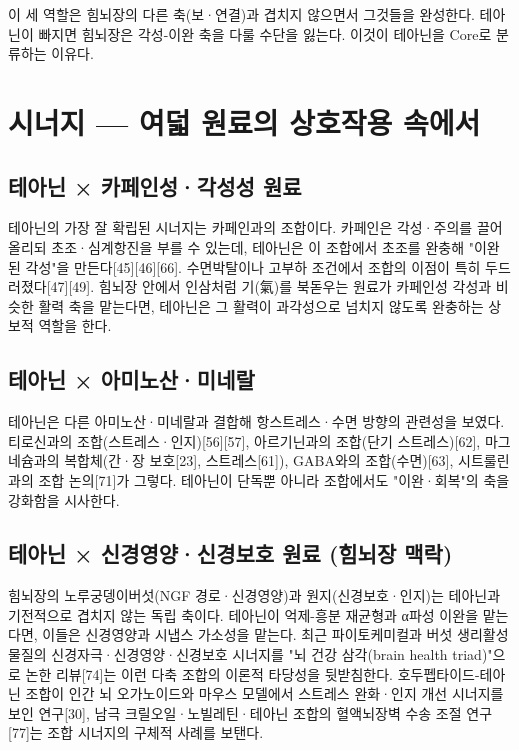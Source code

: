 \documentclass[12pt,oneside]{book}
\begin{document}
이 세 역할은 힘뇌장의 다른 축(보·연결)과 겹치지 않으면서 그것들을 완성한다. 테아닌이 빠지면 힘뇌장은 각성-이완 축을 다룰 수단을 잃는다. 이것이 테아닌을 Core로 분류하는 이유다.

\section{시너지 — 여덟 원료의 상호작용 속에서}

\subsection{테아닌 × 카페인성·각성성 원료}

테아닌의 가장 잘 확립된 시너지는 카페인과의 조합이다. 카페인은 각성·주의를 끌어올리되 초조·심계항진을 부를 수 있는데, 테아닌은 이 조합에서 초조를 완충해 "이완된 각성"을 만든다[45][46][66]. 수면박탈이나 고부하 조건에서 조합의 이점이 특히 두드러졌다[47][49]. 힘뇌장 안에서 인삼처럼 기(氣)를 북돋우는 원료가 카페인성 각성과 비슷한 활력 축을 맡는다면, 테아닌은 그 활력이 과각성으로 넘치지 않도록 완충하는 상보적 역할을 한다.

\subsection{테아닌 × 아미노산·미네랄}

테아닌은 다른 아미노산·미네랄과 결합해 항스트레스·수면 방향의 관련성을 보였다. 티로신과의 조합(스트레스·인지)[56][57], 아르기닌과의 조합(단기 스트레스)[62], 마그네슘과의 복합체(간·장 보호[23], 스트레스[61]), GABA와의 조합(수면)[63], 시트룰린과의 조합 논의[71]가 그렇다. 테아닌이 단독뿐 아니라 조합에서도 "이완·회복"의 축을 강화함을 시사한다.

\subsection{테아닌 × 신경영양·신경보호 원료 (힘뇌장 맥락)}

힘뇌장의 노루궁뎅이버섯(NGF 경로·신경영양)과 원지(신경보호·인지)는 테아닌과 기전적으로 겹치지 않는 독립 축이다. 테아닌이 억제-흥분 재균형과 α파성 이완을 맡는다면, 이들은 신경영양과 시냅스 가소성을 맡는다. 최근 파이토케미컬과 버섯 생리활성물질의 신경자극·신경영양·신경보호 시너지를 "뇌 건강 삼각(brain health triad)"으로 논한 리뷰[74]는 이런 다축 조합의 이론적 타당성을 뒷받침한다. 호두펩타이드-테아닌 조합이 인간 뇌 오가노이드와 마우스 모델에서 스트레스 완화·인지 개선 시너지를 보인 연구[30], 남극 크릴오일·노빌레틴·테아닌 조합의 혈액뇌장벽 수송 조절 연구[77]는 조합 시너지의 구체적 사례를 보탠다.
\end{document}

